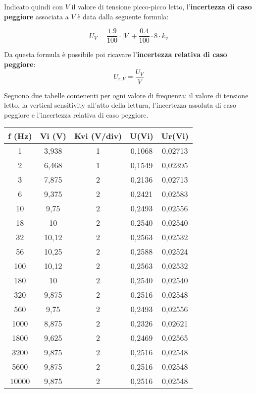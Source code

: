 Indicato quindi con $V$ il valore di tensione picco-picco letto, l'\textbf{incertezza di caso peggiore} associata a $V$ è data dalla seguente formula:

\[U_V = \frac{1.9}{100} \cdot |V| + \frac{0.4}{100} \cdot 8 \cdot k_v\]

Da questa formula è possibile poi ricavare l'\textbf{incertezza relativa di caso peggiore}:
\[U_{r,V} = \frac{U_V}{V}\]

Seguono due tabelle contenenti per ogni valore di frequenza: il valore di tensione letto, la vertical sensitivity all'atto della lettura, l'incertezza assoluta di caso peggiore e l'incertezza relativa di caso peggiore.

\begin{table}[!ht]
    \centering
    \begin{tabular}{|c|c|c|c|c|}
    \hline
        \textbf{f (Hz)} & \textbf{Vi (V)} & \textbf{Kvi (V/div)} & \textbf{U(Vi)} & \textbf{Ur(Vi)} \\ \hline
        1 & 3,938 & 1 & 0,1068 & 0,02713 \\ \hline
        2 & 6,468 & 1 & 0,1549 & 0,02395 \\ \hline
        3 & 7,875 & 2 & 0,2136 & 0,02713 \\ \hline
        6 & 9,375 & 2 & 0,2421 & 0,02583 \\ \hline
        10 & 9,75 & 2 & 0,2493 & 0,02556 \\ \hline
        18 & 10 & 2 & 0,2540 & 0,02540 \\ \hline
        32 & 10,12 & 2 & 0,2563 & 0,02532 \\ \hline
        56 & 10,25 & 2 & 0,2588 & 0,02524 \\ \hline
        100 & 10,12 & 2 & 0,2563 & 0,02532 \\ \hline
        180 & 10 & 2 & 0,2540 & 0,02540 \\ \hline
        320 & 9,875 & 2 & 0,2516 & 0,02548 \\ \hline
        560 & 9,75 & 2 & 0,2493 & 0,02556 \\ \hline
        1000 & 8,875 & 2 & 0,2326 & 0,02621 \\ \hline
        1800 & 9,625 & 2 & 0,2469 & 0,02565 \\ \hline
        3200 & 9,875 & 2 & 0,2516 & 0,02548 \\ \hline
        5600 & 9,875 & 2 & 0,2516 & 0,02548 \\ \hline
        10000 & 9,875 & 2 & 0,2516 & 0,02548 \\ \hline
    \end{tabular}
\end{table}

